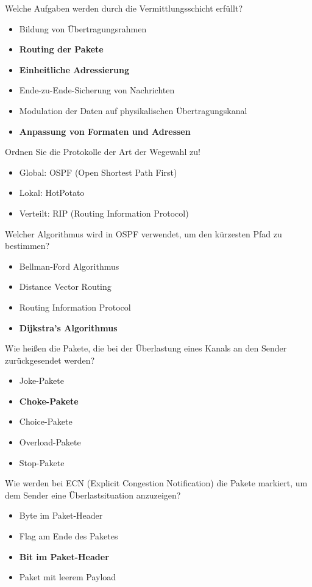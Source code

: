 \documentclass{article}
\begin{document}
	Welche Aufgaben werden durch die Vermittlungsschicht erfüllt?
	\begin{itemize}
		\item Bildung von Übertragungsrahmen
		\item \textbf{Routing der Pakete}
		\item \textbf{Einheitliche Adressierung}
		\item Ende-zu-Ende-Sicherung von Nachrichten
		\item Modulation der Daten auf physikalischen Übertragungskanal
		\item \textbf{Anpassung von Formaten und Adressen}
	\end{itemize}

	Ordnen Sie die Protokolle der Art der Wegewahl zu! 
	\begin{itemize}
		\item Global: OSPF (Open Shortest Path First) 
		\item Lokal: HotPotato
		\item Verteilt: RIP (Routing Information Protocol) 
	\end{itemize}

	 Welcher Algorithmus wird in OSPF verwendet, um den kürzesten Pfad zu bestimmen? 
	 \begin{itemize}
	 	\item Bellman-Ford Algorithmus
	 	\item Distance Vector Routing 
	 	\item Routing Information Protocol 
	 	\item \textbf{Dijkstra’s Algorithmus}
	 \end{itemize}
 
 	Wie heißen die Pakete, die bei der Überlastung eines Kanals an den Sender zurückgesendet werden?
 	\begin{itemize}
 		\item Joke-Pakete
 		\item \textbf{Choke-Pakete }
 		\item Choice-Pakete
 		\item Overload-Pakete
 		\item Stop-Pakete
 	\end{itemize}
 
 	Wie werden bei ECN (Explicit Congestion Notification) die Pakete markiert, um dem Sender eine Überlastsituation anzuzeigen?
 	\begin{itemize}
 		\item Byte im Paket-Header
 		\item Flag am Ende des Paketes
 		\item \textbf{Bit im Paket-Header}
 		\item Paket mit leerem Payload
 	\end{itemize}
	
\end{document}
